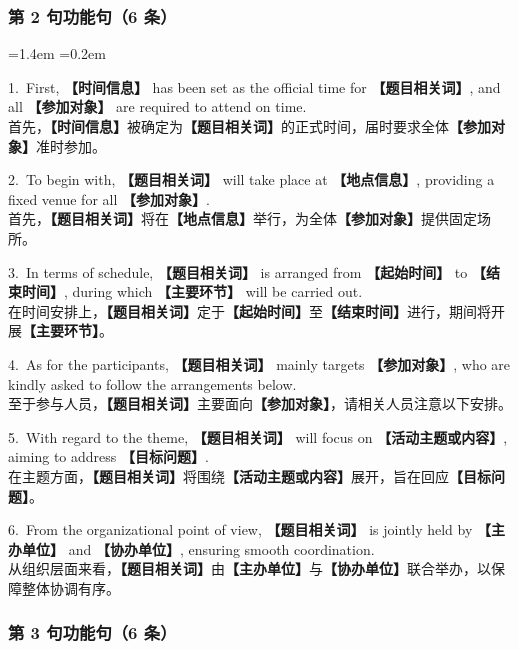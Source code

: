 \documentclass[11pt,a4paper]{ctexart}
\newcommand{\fillin}[1]{{\bfseries【#1】}}
\newenvironment{eg}{%
  \par\addvspace{4pt}%
  \begin{list}{}{\leftmargin=1.4em \rightmargin=0.2em \listparindent=0pt
    \itemindent=0pt \topsep=0pt \parsep=2pt \itemsep=2pt \partopsep=0pt}%
  \item\relax
}{%
  \end{list}\addvspace{5pt}%
}
\begin{document}
\subsubsection{第 2 句功能句（6 条）}

\begin{eg}
1.\ First, \fillin{时间信息} has been set as the official time for \fillin{题目相关词}, and all \fillin{参加对象} are required to attend on time.\\
首先，\fillin{时间信息}被确定为\fillin{题目相关词}的正式时间，届时要求全体\fillin{参加对象}准时参加。

2.\ To begin with, \fillin{题目相关词} will take place at \fillin{地点信息}, providing a fixed venue for all \fillin{参加对象}.\\
首先，\fillin{题目相关词}将在\fillin{地点信息}举行，为全体\fillin{参加对象}提供固定场所。

3.\ In terms of schedule, \fillin{题目相关词} is arranged from \fillin{起始时间} to \fillin{结束时间}, during which \fillin{主要环节} will be carried out.\\
在时间安排上，\fillin{题目相关词}定于\fillin{起始时间}至\fillin{结束时间}进行，期间将开展\fillin{主要环节}。

4.\ As for the participants, \fillin{题目相关词} mainly targets \fillin{参加对象}, who are kindly asked to follow the arrangements below.\\
至于参与人员，\fillin{题目相关词}主要面向\fillin{参加对象}，请相关人员注意以下安排。

5.\ With regard to the theme, \fillin{题目相关词} will focus on \fillin{活动主题或内容}, aiming to address \fillin{目标问题}.\\
在主题方面，\fillin{题目相关词}将围绕\fillin{活动主题或内容}展开，旨在回应\fillin{目标问题}。

6.\ From the organizational point of view, \fillin{题目相关词} is jointly held by \fillin{主办单位} and \fillin{协办单位}, ensuring smooth coordination.\\
从组织层面来看，\fillin{题目相关词}由\fillin{主办单位}与\fillin{协办单位}联合举办，以保障整体协调有序。
\end{eg}

\subsubsection{第 3 句功能句（6 条）}
\end{document}
